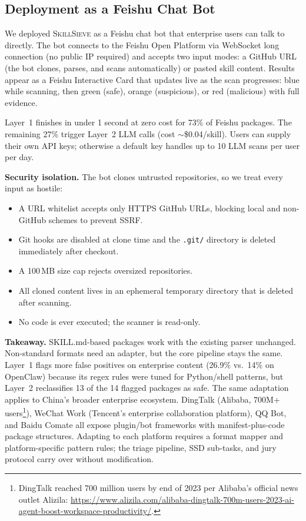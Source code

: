 \documentclass[sigconf,nonacm]{acmart}
\begin{document}
\subsection{Deployment as a Feishu Chat Bot}

We deployed \textsc{SkillSieve} as a Feishu chat bot that enterprise users can talk to directly. The bot connects to the Feishu Open Platform via WebSocket long connection (no public IP required) and accepts two input modes: a GitHub URL (the bot clones, parses, and scans automatically) or pasted skill content. Results appear as a Feishu Interactive Card that updates live as the scan progresses: blue while scanning, then green (safe), orange (suspicious), or red (malicious) with full evidence.

Layer~1 finishes in under 1 second at zero cost for 73\% of Feishu packages. The remaining 27\% trigger Layer~2 LLM calls (cost $\sim$\$0.04/skill). Users can supply their own API keys; otherwise a default key handles up to 10 LLM scans per user per day.

\textbf{Security isolation.} The bot clones untrusted repositories, so we treat every input as hostile:
\begin{itemize}
    \item A URL whitelist accepts only HTTPS GitHub URLs, blocking local and non-GitHub schemes to prevent SSRF.
    \item Git hooks are disabled at clone time and the \texttt{.git/} directory is deleted immediately after checkout.
    \item A 100\,MB size cap rejects oversized repositories.
    \item All cloned content lives in an ephemeral temporary directory that is deleted after scanning.
    \item No code is ever executed; the scanner is read-only.
\end{itemize}

\textbf{Takeaway.} SKILL.md-based packages work with the existing parser unchanged. Non-standard formats need an adapter, but the core pipeline stays the same. Layer~1 flags more false positives on enterprise content (26.9\% vs.\ 14\% on OpenClaw) because its regex rules were tuned for Python/shell patterns, but Layer~2 reclassifies 13 of the 14 flagged packages as safe. The same adaptation applies to China's broader enterprise ecosystem. DingTalk (Alibaba, 700M+ users\footnote{DingTalk reached 700 million users by end of 2023 per Alibaba's official news outlet Alizila: \url{https://www.alizila.com/alibaba-dingtalk-700m-users-2023-ai-agent-boost-workspace-productivity/}.}), WeChat Work (Tencent's enterprise collaboration platform), QQ Bot, and Baidu Comate all expose plugin/bot frameworks with manifest-plus-code package structures. Adapting to each platform requires a format mapper and platform-specific pattern rules; the triage pipeline, SSD sub-tasks, and jury protocol carry over without modification.
\end{document}
